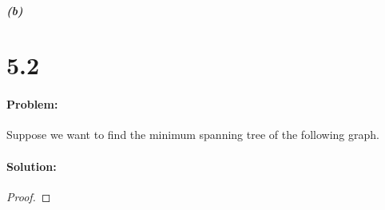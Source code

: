 \documentclass[12pt]{article}
\begin{document}
\subparagraph{(b)}

\section*{5.2}
\paragraph{Problem:}
Suppose we want to find the minimum spanning tree of the following graph.

\begin{comment}
\begin{tikzpicture}[->,>=stealth',shorten >=1pt,auto,node distance=3cm,
  thick,main node/.style={circle,fill=blue!20,draw,font=\sffamily\Large\bfseries}]
  \node[main node] (a) {a};
  \node[main node] (b) [right of=a]{b};
  \node[main node] (c) [right of=b]{c};
  \node[main node] (d) [right of=c]{d};
  \node[main node] (e) [below of=a]{e};
  \node[main node] (f) [below of=b]{f};
  \node[main node] (g) [below of=c]{g};
  \node[main node] (h) [below of=d]{h};
  \tikzset{LabelStyle/.style =   {draw,
				  fill           = yellow,
				  text           = red}}
  \path[every node/.style={font=\sffamily\small}]
  \draw[EdgeStyle](a) to node[LabelStyle]{1} (b);
  \draw[EdgeStyle](a) to node[LabelStyle]{8} (f);
  \draw[EdgeStyle](a) to node[LabelStyle]{4} (e);
  \draw[EdgeStyle](b) to node[LabelStyle]{2} (c);
  \draw[EdgeStyle](b) to node[LabelStyle]{6} (g);
  \draw[EdgeStyle](b) to node[LabelStyle]{6} (f);
  \draw[EdgeStyle](c) to node[LabelStyle]{3} (d);
  \draw[EdgeStyle](c) to node[LabelStyle]{2} (g);
  \draw[EdgeStyle](d) to node[LabelStyle]{1} (g);
  \draw[EdgeStyle](d) to node[LabelStyle]{4} (h);
  \draw[EdgeStyle](e) to node[LabelStyle]{5} (f);
  \draw[EdgeStyle](f) to node[LabelStyle]{1} (g);
  \draw[EdgeStyle](g) to node[LabelStyle]{1} (h);
\end{tikzpicture}
(a) Run Prim’s algorithm; whenever there is a choice of nodes, always use alphabetic ordering
(e.g., start from node A). Draw a table showing the intermediate values of the cost array.
(b) Run Kruskal’s algorithm on the same graph. Show how the disjoint-sets data structure
looks at every intermediate stage (including the structure of the directed trees), assuming
path compression is used.
\end{comment}

\paragraph{Solution:}
\begin{proof}
\end{proof}
\end{document}

